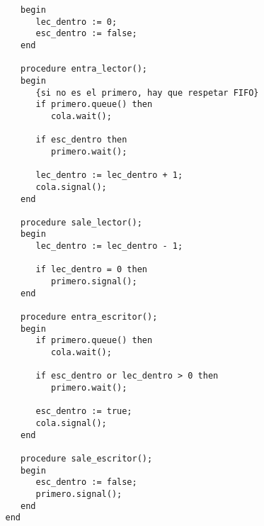 \begin{ejercicio}
\begin{enumerate}
\begin{verbatim}
                   begin
                      lec_dentro := 0;
                      esc_dentro := false;
                   end

                   procedure entra_lector();
                   begin
                      {si no es el primero, hay que respetar FIFO}
                      if primero.queue() then 
                         cola.wait();

                      if esc_dentro then
                         primero.wait();

                      lec_dentro := lec_dentro + 1;
                      cola.signal();
                   end

                   procedure sale_lector();
                   begin
                      lec_dentro := lec_dentro - 1;

                      if lec_dentro = 0 then
                         primero.signal();
                   end

                   procedure entra_escritor();
                   begin
                      if primero.queue() then
                         cola.wait();

                      if esc_dentro or lec_dentro > 0 then
                         primero.wait();

                      esc_dentro := true;
                      cola.signal();
                   end

                   procedure sale_escritor();
                   begin
                      esc_dentro := false;
                      primero.signal();
                   end
                end
            \end{verbatim}
    \end{enumerate}
\end{ejercicio}

